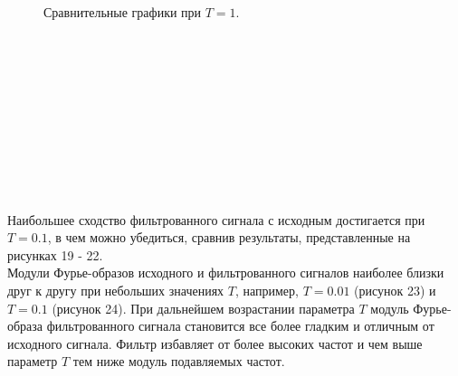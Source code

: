\documentclass[a5paper, 10pt]{article}
\theoremstyle{definition}
\theoremstyle{plain}
\theoremstyle{remark}
\begin{document}
\begin{figure}[h!]
\caption{Сравнительные графики при $T = 1$.}
\end{figure}
\, \\
\\
\\
\\
\\
\\
\\
\\
\\
\\
Наибольшее сходство фильтрованного сигнала с исходным достигается при $T=0.1$, в чем можно убедиться, сравнив результаты, представленные на рисунках 19 - 22.\\

Модули Фурье-образов исходного и фильтрованного сигналов наиболее близки друг к другу при небольших значениях $T$, например, $T=0.01$ (рисунок 23) и $T=0.1$ (рисунок 24). При дальнейшем возрастании параметра $T$ модуль Фурье-образа фильтрованного сигнала становится все более гладким и отличным от исходного сигнала. Фильтр избавляет от более высоких частот и чем выше параметр $T$ тем ниже модуль подавляемых частот.
\end{document}
